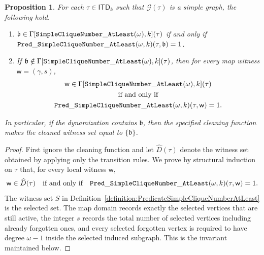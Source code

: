 \documentclass[11pt,a4paper]{article}
\newtheorem{proposition}[theorem]{Proposition}
\newcommand{\truevalue}{1}
\newcommand{\treewidthvalue}{k}
\newcommand{\decompositiongraph}[1]{\mathcal{G}(#1)}
\newcommand{\allabstractdecompositionstreewidth}[1]{\mathsf{ITD}_{#1}}
\newcommand{\abstractdecomposition}{\tau}
\newcommand{\awitness}{\mathsf{w}}
\newcommand{\dpNamePart}[1]{\mbox{\normalfont\ttfamily #1}}
\newcommand{\simpleCliqueNumberAtLeastCore}[1]{\dpNamePart{SimpleCliqueNumber}\_\allowbreak\dpNamePart{AtLeast}(#1)}
\newcommand{\dynamizationfunctionname}[1]{\Gamma[{#1}]}
\newcommand{\dynamizationfunction}[2]{\dynamizationfunctionname{#1,#2}}
\newcommand{\cliqueparameter}{\omega}
\newcommand{\cliquemap}{\gamma}
\newcommand{\cliquesize}{s}
\newcommand{\cliquefound}{\mathfrak{b}}
\newcommand{\predicateSimpleCliqueNumberAtLeast}[2]{\dpNamePart{Pred}\_\allowbreak\dpNamePart{SimpleCliqueNumber}\_\allowbreak\dpNamePart{AtLeast}(#1,#2)}
\newcommand{\vertexsub}{S}
\begin{document}
{			\begin{proposition}
				\label{proposition:PredicateSimpleCliqueNumberAtLeast}
				For each $\abstractdecomposition\in \allabstractdecompositionstreewidth{\treewidthvalue}$ such that $\decompositiongraph{\abstractdecomposition}$ is a simple graph, the following hold.
				\begin{enumerate}
				\item $\cliquefound\in \dynamizationfunction{\simpleCliqueNumberAtLeastCore{\cliqueparameter}}{\treewidthvalue}(\abstractdecomposition)$ if and only if $\predicateSimpleCliqueNumberAtLeast{\cliqueparameter}{\treewidthvalue}(\abstractdecomposition,\cliquefound)=\truevalue$.
					\item If $\cliquefound\notin \dynamizationfunction{\simpleCliqueNumberAtLeastCore{\cliqueparameter}}{\treewidthvalue}(\abstractdecomposition)$, then for every map witness $\awitness=(\cliquemap,\cliquesize)$,
					\begin{multline*}
					\awitness\in \dynamizationfunction{\simpleCliqueNumberAtLeastCore{\cliqueparameter}}{\treewidthvalue}(\abstractdecomposition)
					\\
					\text{if and only if}\\
					\predicateSimpleCliqueNumberAtLeast{\cliqueparameter}{\treewidthvalue}(\abstractdecomposition,\awitness)=\truevalue.
					\end{multline*}
				\end{enumerate}
				In particular, if the dynamization contains $\cliquefound$, then the specified cleaning function makes the cleaned witness set equal to $\{\cliquefound\}$.
				\end{proposition}

				\begin{proof}
				First ignore the cleaning function and let $\widehat D(\abstractdecomposition)$ denote the witness set obtained by applying only the transition rules. We prove by structural induction on $\abstractdecomposition$ that, for every local witness $\awitness$,
				\[
				\awitness\in \widehat D(\abstractdecomposition)
				\quad\text{if and only if}\quad
				\predicateSimpleCliqueNumberAtLeast{\cliqueparameter}{\treewidthvalue}(\abstractdecomposition,\awitness)=\truevalue.
				\]
				The witness set $\vertexsub$ in Definition~\ref{definition:PredicateSimpleCliqueNumberAtLeast} is the selected set. The map domain records exactly the selected vertices that are still active, the integer $\cliquesize$ records the total number of selected vertices including already forgotten ones, and every selected forgotten vertex is required to have degree $\cliqueparameter-1$ inside the selected induced subgraph. This is the invariant maintained below.


\end{proof}}
\end{document}
